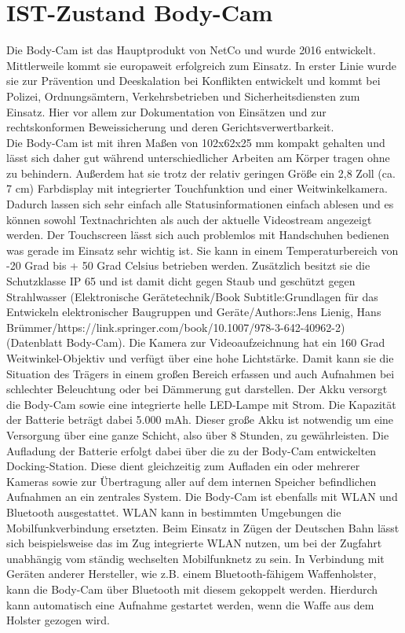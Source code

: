 \documentclass[thesis.tex]{subfiles}
\begin{document}
\section{IST-Zustand Body-Cam}

Die Body-Cam ist das Hauptprodukt von NetCo und wurde 2016 entwickelt. Mittlerweile kommt sie europaweit erfolgreich zum Einsatz.
In erster Linie wurde sie zur Prävention und Deeskalation bei Konflikten entwickelt und kommt bei Polizei, Ordnungsämtern, Verkehrsbetrieben und Sicherheitsdiensten zum Einsatz.
Hier vor allem zur Dokumentation von Einsätzen und zur rechtskonformen Beweissicherung und deren Gerichtsverwertbarkeit.
\\

Die Body-Cam ist mit ihren Maßen von 102x62x25 mm kompakt gehalten und lässt sich daher gut während unterschiedlicher Arbeiten am Körper tragen ohne zu behindern.
Außerdem hat sie trotz der relativ geringen Größe ein 2,8 Zoll (ca. 7 cm) Farbdisplay mit integrierter Touchfunktion und einer Weitwinkelkamera. Dadurch lassen sich sehr einfach alle Statusinformationen einfach ablesen und es können sowohl Textnachrichten als auch der aktuelle Videostream angezeigt werden.
Der Touchscreen lässt sich auch problemlos mit Handschuhen bedienen was gerade im Einsatz sehr wichtig ist.
Sie kann in einem Temperaturbereich von -20 Grad bis + 50 Grad Celsius betrieben werden.
Zusätzlich besitzt sie die Schutzklasse IP 65 und ist damit dicht gegen Staub und geschützt gegen Strahlwasser
(Elektronische Gerätetechnik/Book Subtitle:Grundlagen für das Entwickeln elektronischer Baugruppen und Geräte/Authors:Jens Lienig, Hans Brümmer/https://link.springer.com/book/10.1007/978-3-642-40962-2) (Datenblatt Body-Cam).
Die Kamera zur Videoaufzeichnung hat ein 160 Grad Weitwinkel-Objektiv und verfügt über eine hohe Lichtstärke.
Damit kann sie die Situation des Trägers in einem großen Bereich erfassen und auch Aufnahmen bei schlechter Beleuchtung oder bei Dämmerung gut darstellen.
Der Akku versorgt die Body-Cam sowie eine integrierte helle LED-Lampe mit Strom.
Die Kapazität der Batterie beträgt dabei 5.000 mAh.
Dieser große Akku ist notwendig um eine Versorgung über eine ganze Schicht, also über 8 Stunden, zu gewährleisten.
Die Aufladung der Batterie erfolgt dabei über die zu der Body-Cam entwickelten Docking-Station.
Diese dient gleichzeitig zum Aufladen ein oder mehrerer Kameras sowie zur Übertragung aller auf dem internen Speicher befindlichen Aufnahmen an ein zentrales System.
Die Body-Cam ist ebenfalls mit WLAN und Bluetooth ausgestattet.
WLAN kann in bestimmten Umgebungen die Mobilfunkverbindung ersetzten.
Beim Einsatz in Zügen der Deutschen Bahn lässt sich beispielsweise das im Zug integrierte WLAN nutzen, um bei der Zugfahrt unabhängig vom ständig wechselten Mobilfunknetz zu sein.
In Verbindung mit Geräten anderer Hersteller, wie z.B. einem Bluetooth-fähigem Waffenholster, kann die Body-Cam über Bluetooth mit diesem gekoppelt werden.
Hierdurch kann automatisch eine Aufnahme gestartet werden, wenn die Waffe aus dem Holster gezogen wird.
\\
\end{document}
